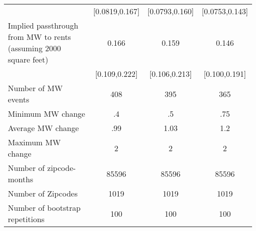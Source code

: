{\begin{tabular}{l*{3}{c}}
            &        [0.0819,0.167]         &        [0.0793,0.160]         &        [0.0753,0.143]         \\
[1em]
Implied passthrough from MW to rents (assuming 2000 square feet)&                 0.166\sym{***}&                 0.159\sym{***}&                 0.146\sym{***}\\
            &         [0.109,0.222]         &         [0.106,0.213]         &         [0.100,0.191]         \\
\hline
Number of MW events&                   408         &                   395         &                   365         \\
Minimum MW change&                    .4         &                    .5         &                   .75         \\
Average MW change&                   .99         &                  1.03         &                   1.2         \\
Maximum MW change&                     2         &                     2         &                     2         \\
Number of zipcode-months&                 85596         &                 85596         &                 85596         \\
Number of Zipcodes&                  1019         &                  1019         &                  1019         \\
Number of bootstrap repetitions&                   100         &                   100         &                   100         \\
\hline\hline
\end{tabular}
}
